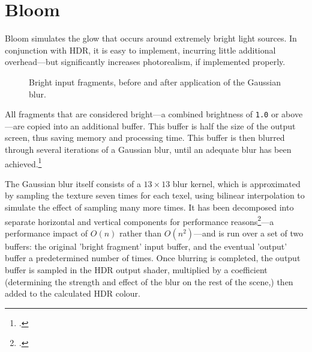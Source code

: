 \documentclass[11pt, oneside]{report}
\begin{document}
\section{Bloom}
Bloom simulates the glow that occurs around extremely bright light sources. In conjunction with \gls{HDR}, it is easy to implement, incurring little additional overhead---but significantly increases photorealism, if implemented properly.

\begin{figure}[!htbp]
  \centering
  \hfill
  \caption{Bright input fragments, before and after application of the Gaussian blur.}
\end{figure}

All fragments that are considered bright---a combined brightness of \texttt{1.0} or above---are copied into an additional buffer. This buffer is half the size of the output screen, thus saving memory and processing time. This buffer is then blurred through several iterations of a Gaussian blur, until an adequate blur has been achieved.\footcite{gpupro-hdr}

The Gaussian blur itself consists of a $13 \times 13$ blur kernel, which is approximated by sampling the texture seven times for each \gls{texel}, using bilinear interpolation to simulate the effect of sampling many more times. It has been decomposed into separate horizontal and vertical components for performance reasons\footcite{intel-blur}---a performance impact of $O(n)$ rather than $O(n^2)$---and is run over a set of two buffers: the original 'bright fragment' input buffer, and the eventual 'output' buffer a predetermined number of times. Once blurring is completed, the output buffer is sampled in the \gls{HDR} output shader, multiplied by a coefficient (determining the strength and effect of the blur on the rest of the scene,) then added to the calculated \gls{HDR} colour.
\end{document}
